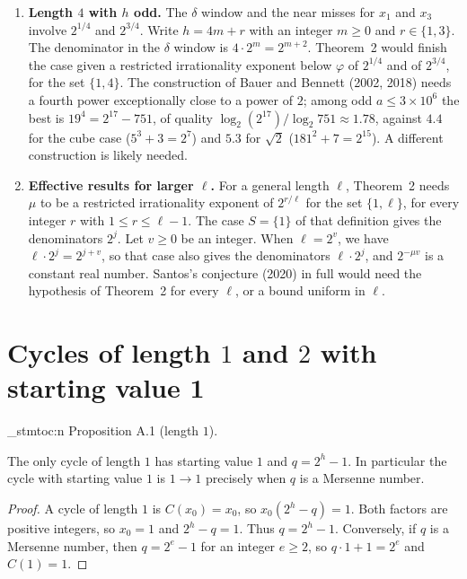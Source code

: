 \documentclass[11pt]{article}
\newenvironment{named}[1]{%
  \par\addvspace{\medskipamount}%
  \pagebreak[3]%
  \noindent{\bfseries #1}\space\ignorespaces
  \stmtoc{#1}%
}{\par\addvspace{\medskipamount}}
\newcommand{\stmtoc}[1]{ \qn_stmtoc:n {#1} }
\begin{document}
\begin{enumerate}
\item \textbf{Length $4$ with $h$ odd.}
The $\delta$ window and the near misses for $x_1$ and $x_3$ involve $2^{1/4}$ and $2^{3/4}$.
Write $h = 4m + r$ with an integer $m \ge 0$ and $r \in \{1, 3\}$. The denominator in the $\delta$ window is $4 \cdot 2^m = 2^{m+2}$.
Theorem~2 would finish the case given a restricted irrationality exponent below $\varphi$ of $2^{1/4}$ and of $2^{3/4}$, for the set $\{1, 4\}$.
The construction of Bauer and Bennett (2002, 2018) needs a fourth power exceptionally close to a power of $2$; among odd $a \le 3 \times 10^6$ the best is $19^4 = 2^{17} - 751$, of quality $\log_2(2^{17})/\log_2 751 \approx 1.78$, against $4.4$ for the cube case ($5^3 + 3 = 2^7$) and $5.3$ for $\sqrt{2}$ ($181^2 + 7 = 2^{15}$).
A different construction is likely needed.
\item \textbf{Effective results for larger $\ell$.}
For a general length $\ell$, Theorem~2 needs $\mu$ to be a restricted irrationality exponent of $2^{r/\ell}$ for the set $\{1, \ell\}$, for every integer $r$ with $1 \le r \le \ell-1$. The case $S = \{1\}$ of that definition gives the denominators $2^j$. Let $v \ge 0$ be an integer. When $\ell = 2^v$, we have $\ell \cdot 2^j = 2^{j+v}$, so that case also gives the denominators $\ell \cdot 2^j$, and $2^{-\mu v}$ is a constant real number.
Santos's conjecture (2020) in full would need the hypothesis of Theorem~2 for every $\ell$, or a bound uniform in $\ell$.
\end{enumerate}

\appendix

\section{Cycles of length $1$ and $2$ with starting value 1}
\label{app:one-two}

\label{prop:a1}
\begin{named}{Proposition A.1 (length $1$).}
The only cycle of length $1$ has starting value $1$ and $q = 2^h - 1$.
In particular the cycle with starting value $1$ is $1 \to 1$ precisely when $q$ is a Mersenne number.
\end{named}

\begin{proof}
A cycle of length $1$ is $C(x_0) = x_0$, so $x_0(2^h - q) = 1$.
Both factors are positive integers, so $x_0 = 1$ and $2^h - q = 1$.
Thus $q = 2^h - 1$.
Conversely, if $q$ is a Mersenne number, then $q = 2^e - 1$ for an integer $e \ge 2$, so $q \cdot 1 + 1 = 2^e$ and $C(1) = 1$.
\end{proof}
\end{document}
